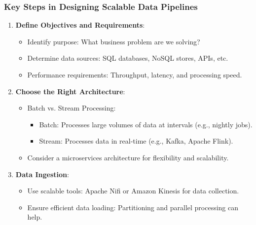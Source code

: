 \documentclass{beamer}
\begin{document}
\begin{frame}[fragile]
    \frametitle{Key Steps in Designing Scalable Data Pipelines}
    \begin{enumerate}
        \item \textbf{Define Objectives and Requirements}:
        \begin{itemize}
            \item Identify purpose: What business problem are we solving?
            \item Determine data sources: SQL databases, NoSQL stores, APIs, etc.
            \item Performance requirements: Throughput, latency, and processing speed.
        \end{itemize}
    
        \item \textbf{Choose the Right Architecture}:
        \begin{itemize}
            \item Batch vs. Stream Processing:
            \begin{itemize}
                \item Batch: Processes large volumes of data at intervals (e.g., nightly jobs).
                \item Stream: Processes data in real-time (e.g., Kafka, Apache Flink).
            \end{itemize}
            \item Consider a microservices architecture for flexibility and scalability.
        \end{itemize}
        
        \item \textbf{Data Ingestion}:
        \begin{itemize}
            \item Use scalable tools: Apache Nifi or Amazon Kinesis for data collection.
            \item Ensure efficient data loading: Partitioning and parallel processing can help.
        \end{itemize}
    \end{enumerate}
\end{frame}
\end{document}
